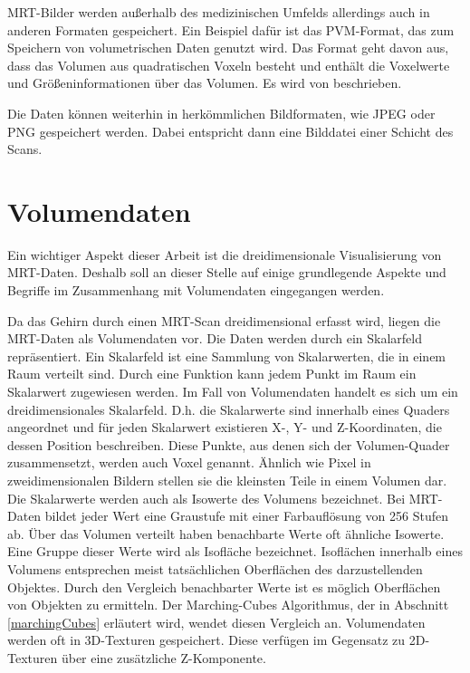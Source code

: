 MRT-Bilder werden außerhalb des medizinischen Umfelds allerdings auch in anderen Formaten gespeichert. 
Ein Beispiel dafür ist das PVM-Format, das zum Speichern von volumetrischen Daten genutzt wird. Das Format geht davon aus, dass das Volumen aus quadratischen Voxeln besteht und enthält die Voxelwerte und Größeninformationen über das Volumen. Es wird von \cite{pvm} beschrieben.

Die Daten können weiterhin in herkömmlichen Bildformaten, wie JPEG oder PNG gespeichert werden. Dabei entspricht dann eine Bilddatei einer Schicht des Scans. 
 

\section{Volumendaten}
\label{volumeData}					  	  %

Ein wichtiger Aspekt dieser Arbeit ist die dreidimensionale Visualisierung von MRT-Daten. Deshalb soll an dieser Stelle auf einige grundlegende Aspekte und Begriffe im Zusammenhang mit Volumendaten eingegangen werden.

Da das Gehirn durch einen MRT-Scan dreidimensional erfasst wird, liegen die MRT-Daten als Volumendaten vor. Die Daten werden durch ein Skalarfeld repräsentiert. Ein Skalarfeld ist eine Sammlung von Skalarwerten, die in einem Raum verteilt sind. Durch eine Funktion kann jedem Punkt im Raum ein Skalarwert zugewiesen werden. Im Fall von Volumendaten handelt es sich um ein dreidimensionales Skalarfeld. D.h. die Skalarwerte sind innerhalb eines Quaders angeordnet und für jeden Skalarwert existieren X-, Y- und Z-Koordinaten, die dessen Position beschreiben. 
Diese Punkte, aus denen sich der Volumen-Quader zusammensetzt, werden auch Voxel genannt. Ähnlich wie Pixel in zweidimensionalen Bildern stellen sie die kleinsten Teile in einem Volumen dar. 
Die Skalarwerte werden auch als Isowerte des Volumens bezeichnet. Bei MRT-Daten bildet jeder Wert eine Graustufe mit einer Farbauflösung von 256 Stufen ab. 
Über das Volumen verteilt haben benachbarte Werte oft ähnliche Isowerte. Eine Gruppe dieser Werte wird als Isofläche bezeichnet. Isoflächen innerhalb eines Volumens entsprechen meist tatsächlichen Oberflächen des darzustellenden Objektes. Durch den Vergleich benachbarter Werte ist es möglich Oberflächen von Objekten zu ermitteln. Der Marching-Cubes Algorithmus, der in Abschnitt \ref{marchingCubes} erläutert wird, wendet diesen Vergleich an. 
Volumendaten werden oft in 3D-Texturen gespeichert. Diese verfügen im Gegensatz zu 2D-Texturen über eine zusätzliche Z-Komponente. 

